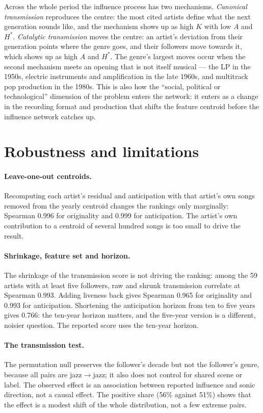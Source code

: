\documentclass[11pt]{article}
\begin{document}
Across the whole period the influence process has two mechanisms.
\emph{Canonical transmission} reproduces the centre: the most cited artists define what the next
generation sounds like, and the mechanism shows up as high $K$ with low $A$ and $H^*$.
\emph{Catalytic transmission} moves the centre: an artist's deviation from their generation points
where the genre goes, and their followers move towards it, which shows up as high $A$ and $H^*$.
The genre's largest moves occur when the second mechanism meets an opening that is not itself
musical --- the LP in the 1950s, electric instruments and amplification in the late 1960s, and
multitrack pop production in the 1980s.
This is also how the ``social, political or technological'' dimension of the problem enters the
network: it enters as a change in the recording format and production that shifts the feature
centroid before the influence network catches up.

\section{Robustness and limitations}
\paragraph{Leave-one-out centroids.}
Recomputing each artist's residual and anticipation with that artist's own songs removed from the
yearly centroid changes the rankings only marginally: Spearman 0.996 for originality and
0.999 for anticipation. The artist's own contribution to a centroid of several hundred songs
is too small to drive the result.

\paragraph{Shrinkage, feature set and horizon.}
The shrinkage of the transmission score is not driving the ranking: among the 59 artists
with at least five followers, raw and shrunk transmission correlate at Spearman 0.993.
Adding liveness back gives Spearman 0.965 for originality and 0.993 for anticipation.
Shortening the anticipation horizon from ten to five years gives 0.766: the ten-year horizon
matters, and the five-year version is a different, noisier question. The reported score uses the
ten-year horizon.

\paragraph{The transmission test.}
The permutation null preserves the follower's decade but not the follower's genre, because all
pairs are jazz$\to$jazz; it also does not control for shared scene or label. The observed effect is
an association between reported influence and sonic direction, not a causal effect. The positive share (56\% against 51\%) shows that the effect is a modest shift of the whole
distribution, not a few extreme pairs.
\end{document}

